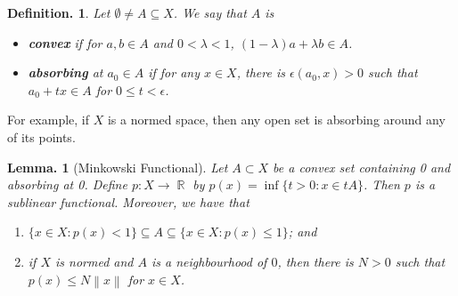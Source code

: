 \documentclass[11pt, a4paper]{memoir}
\DeclareMathOperator{\R}{{\mathbb{R}}}
\newcommand{\norm}[1]{\ensuremath{\left\lVert#1\right\rVert}}
\theoremstyle{change}
\newtheorem{lemma}[theorem]{Lemma.}
\theoremstyle{plain}
\theoremstyle{nonumberplain}
\newtheorem{definition}{Definition.}
\numberwithin{equation}{section}
\begin{document}
\begin{definition}
    Let $\emptyset\neq A\subseteq X$.
    We say that $A$ is
    \begin{itemize}[nl]
        \item \textbf{convex} if for $a,b\in A$ and $0<\lambda<1$, $(1-\lambda)a+\lambda b\in A$.
        \item \textbf{absorbing} at $a_0\in A$ if for any $x\in X$, there is $\epsilon(a_0,x)>0$ such that $a_0+tx\in A$ for $0\leq t<\epsilon$.
    \end{itemize}
\end{definition}
For example, if $X$ is a normed space, then any open set is absorbing around any of its points.
\begin{lemma}[Minkowski Functional]
    Let $A\subset X$ be a convex set containing 0 and absorbing at 0.
    Define $p:X\to\R$ by $p(x)=\inf\{t>0:x\in tA\}$.
    Then $p$ is a sublinear functional.
    Moreover, we have that
    \begin{enumerate}[nl,r]
        \item $\{x\in X:p(x)<1\}\subseteq A\subseteq\{x\in X:p(x)\leq 1\}$; and
        \item if $X$ is normed and $A$ is a neighbourhood of $0$, then there is $N>0$ such that $p(x)\leq N\norm{x}$ for $x\in X$.
    \end{enumerate}
\end{lemma}
\end{document}
